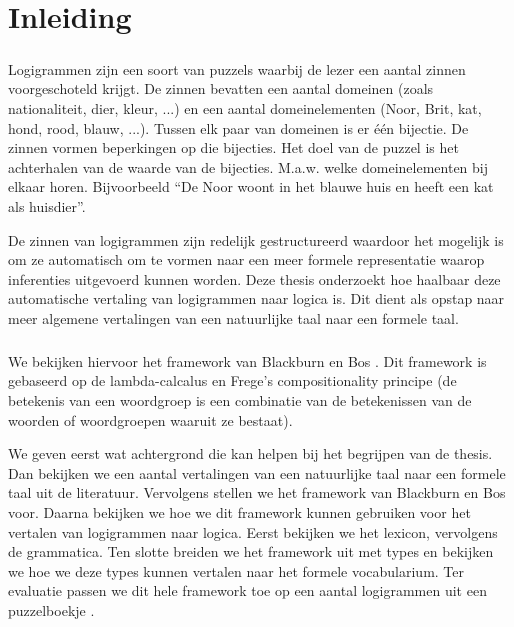 \chapter{Inleiding}
\paragraph{} Logigrammen zijn een soort van puzzels waarbij de lezer een aantal zinnen voorgeschoteld krijgt. De zinnen bevatten een aantal domeinen (zoals nationaliteit, dier, kleur, ...) en een aantal domeinelementen (Noor, Brit, kat, hond, rood, blauw, ...). Tussen elk paar van domeinen is er één bijectie. De zinnen vormen beperkingen op die bijecties. Het doel van de puzzel is het achterhalen van de waarde van de bijecties. M.a.w. welke domeinelementen bij elkaar horen. Bijvoorbeeld ``De Noor woont in het blauwe huis en heeft een kat als huisdier''.

De zinnen van logigrammen zijn redelijk gestructureerd waardoor het mogelijk is om ze automatisch om te vormen naar een meer formele representatie waarop inferenties uitgevoerd kunnen worden. Deze thesis onderzoekt hoe haalbaar deze automatische vertaling van logigrammen naar logica is. Dit dient als opstap naar meer algemene vertalingen van een natuurlijke taal naar een formele taal.

\paragraph{} We bekijken hiervoor het framework van Blackburn en Bos \cite{Blackburn2005, Blackburn2006}. Dit framework is gebaseerd op de lambda-calcalus en Frege's compositionality principe (de betekenis van een woordgroep is een combinatie van de betekenissen van de woorden of woordgroepen waaruit ze bestaat).

We geven eerst wat achtergrond die kan helpen bij het begrijpen van de thesis. Dan bekijken we een aantal vertalingen van een natuurlijke taal naar een formele taal uit de literatuur. Vervolgens stellen we het framework van Blackburn en Bos voor. Daarna bekijken we hoe we dit framework kunnen gebruiken voor het vertalen van logigrammen naar logica. Eerst bekijken we het lexicon, vervolgens de grammatica. Ten slotte breiden we het framework uit met types en bekijken we hoe we deze types kunnen vertalen naar het formele vocabularium. Ter evaluatie passen we dit hele framework toe op een aantal logigrammen uit een puzzelboekje \cite{logigrammen}.
